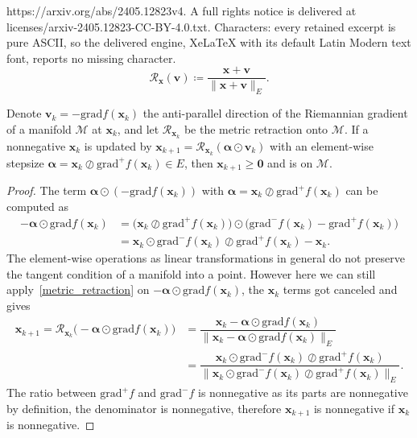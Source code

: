 \documentclass[10pt,a4paper]{amsart}
\def\balpha   {\boldsymbol{\alpha}}
\def\cM { \mathcal{M}}
\def\cR { \mathcal{R}}
\def\grad            {\textrm{grad}}     %
\def\v {\bm{v}}
\def\x {\bm{x}}
\def\zeros           {\bm{0}}            %
\begin{document}
https://arxiv.org/abs/2405.12823v4. A full rights notice is delivered at licenses/arxiv-2405.12823-CC-BY-4.0.txt. Characters: every retained excerpt is pure ASCII, so the delivered engine, XeLaTeX with its default Latin Modern text font, reports no missing character.
\begin{equation}\label{metric_retraction}
\cR_{\x}(\v) \coloneqq 
\dfrac{\x+\v}{\|\x+\v\|_E}.
\tag{Metric retraction}
\end{equation}

\begin{proposition}[RMU]\label{prop:RMU_update}
Denote $\v_k = - \grad f(\x_k)$ the anti-parallel direction of the Riemannian gradient of a manifold $\cM$ at $\x_k$, and let $\cR_{\x_k}$ be the metric retraction onto $\cM$.
If a nonnegative $\x_k$ is updated by $\x_{k+1} = \cR_{\x_k}( \balpha \odot  \v_k)$
with an element-wise stepsize $\balpha=\x_k \oslash \grad^+ f(\x_k) \in E$, then $\x_{k+1} \geq \zeros$ and is on $\cM$.
\end{proposition}

    \begin{proof}
The term $\balpha \odot  (-\grad f(\x_k))$ with $\balpha=\x_k \oslash \grad^+ f(\x_k)$ can be computed as 
\[
\begin{array}{lll}
-\balpha \odot  \grad f(\x_k) 
&=
\big( \x_k \oslash \grad^+ f(\x_k) \big)  \odot  \big( \grad^- f(\x_k) - \grad^+ f(\x_k) \big)
\\
&=
\x_k \odot \grad^- f(\x_k) \oslash \grad^+ f(\x_k) - \x_k .
\end{array}
\]
The element-wise operations as linear transformations  in general do not preserve the tangent condition of a manifold into a point.
However here we can still apply~\eqref{metric_retraction} on $-\balpha \odot  \grad f(\x_k)$, the $\x_k$ terms got canceled and gives
\[
\begin{array}{ll}
\x_{k+1} 
=
\cR_{\x_k}\big( -\balpha \odot  \grad f(\x_k)\big) 
&=
\dfrac{\x_k - \balpha \odot  \grad f(\x_k)}{\| \x_k - \balpha \odot  \grad f(\x_k) \|_E}
\\
&= 
\dfrac{ \x_k \odot \grad^- f(\x_k) \oslash \grad^+ f(\x_k)}
{
\|  \x_k \odot \grad^- f(\x_k) \oslash \grad^+ f(\x_k) \|_E
}.    
\end{array}
\]
The ratio between $\grad^+ f$ and $\grad^- f$ is nonnegative as its parts are nonnegative by definition, the denominator is nonnegative, therefore $\x_{k+1}$ is nonnegative if $\x_k$ is nonnegative.
\end{proof}
\end{document}
